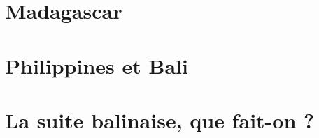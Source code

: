 \documentclass[a5paper, 10pt]{book}
\begin{document}
\chapter{Madagascar}

\pagebreak
\pagebreak
\pagebreak

\chapter{Philippines et Bali}

\pagebreak
\pagebreak
\pagebreak
\pagebreak

\chapter{La suite balinaise, que fait-on ?}


\backmatter
\end{document}
